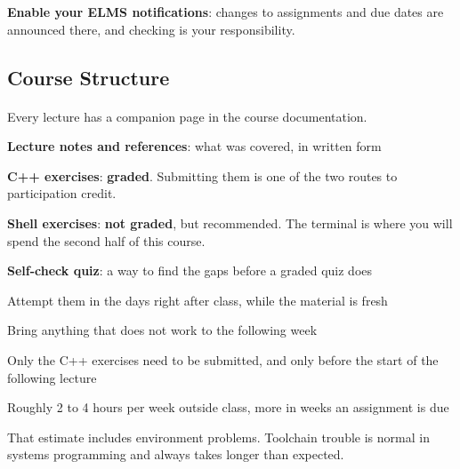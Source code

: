 \documentclass[
    10pt,
    dvipsnames,
    svgnames,
    x11names,
    aspectratio=1610,
    english,
    codeminted]{beamer}
\begin{document}
\begin{frame}{\secname}
\medskip
\begin{MyBox}
\footnotesize
\textbf{Enable your ELMS notifications}: changes to assignments and due dates are announced there, and checking is your responsibility.
\end{MyBox}
\end{frame}
\endgroup


\subsection*{Course Structure}
\begingroup
\divframetrue
\renewcommand{\divbartextA}{\secname}
\renewcommand{\divbartextB}{}
\begin{frame}{\secname}
  \divbar{\secname}{\subsecname}
  \framesubtitle{\subsecname}

Every lecture has a companion page in the course documentation.

\begin{compactitem}
\small
    \item \textbf{Lecture notes and references}: what was covered, in written form
    \item \textbf{C++ exercises}: \textbf{graded}. Submitting them is one of the two routes to participation credit.
    \item \textbf{Shell exercises}: \textbf{not graded}, but recommended. The terminal is where you will spend the second half of this course.
    \item \textbf{Self-check quiz}: a way to find the gaps before a graded quiz does
\end{compactitem}

\medskip
{}
\begin{compactitem}
\small
    \item Attempt them in the days right after class, while the material is fresh
    \item Bring anything that does not work to the following week
    \item Only the C++ exercises need to be submitted, and only before the start of the following lecture
\end{compactitem}

\medskip
{}
\begin{compactitem}
\small
    \item Roughly 2 to 4 hours per week outside class, more in weeks an assignment is due
    \item That estimate includes environment problems. Toolchain trouble is normal in systems programming and always takes longer than expected.
\end{compactitem}
\end{frame}
\endgroup
\end{document}
